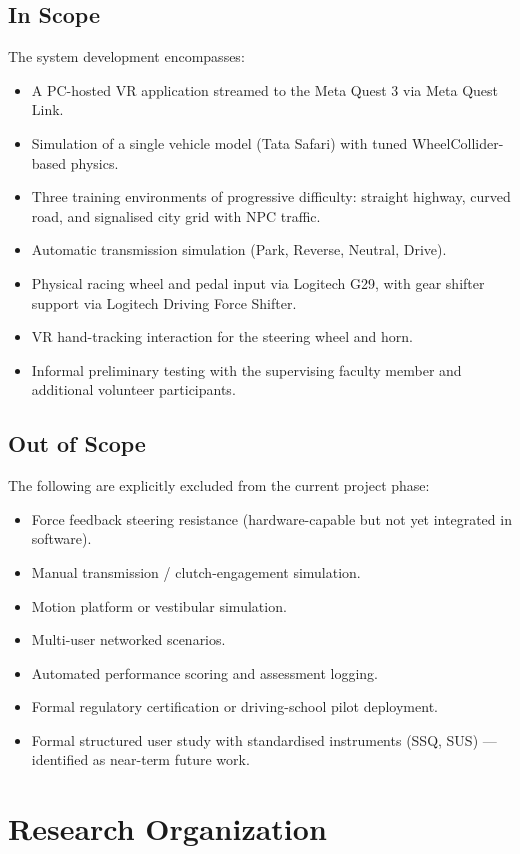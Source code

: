 \subsection{In Scope}
The system development encompasses:
\begin{itemize}
    \item A PC-hosted VR application streamed to the Meta Quest 3 via Meta Quest Link.
    \item Simulation of a single vehicle model (Tata Safari) with tuned WheelCollider-based physics.
    \item Three training environments of progressive difficulty: straight highway, curved road, and signalised city grid with NPC traffic.
    \item Automatic transmission simulation (Park, Reverse, Neutral, Drive).
    \item Physical racing wheel and pedal input via Logitech G29, with gear shifter support via Logitech Driving Force Shifter.
    \item VR hand-tracking interaction for the steering wheel and horn.
    \item Informal preliminary testing with the supervising faculty member and additional volunteer participants.
\end{itemize}

\subsection{Out of Scope}
The following are explicitly excluded from the current project phase:
\begin{itemize}
    \item Force feedback steering resistance (hardware-capable but not yet integrated in software).
    \item Manual transmission / clutch-engagement simulation.
    \item Motion platform or vestibular simulation.
    \item Multi-user networked scenarios.
    \item Automated performance scoring and assessment logging.
    \item Formal regulatory certification or driving-school pilot deployment.
    \item Formal structured user study with standardised instruments (SSQ, SUS) — identified as near-term future work.
\end{itemize}

\section{Research Organization}


